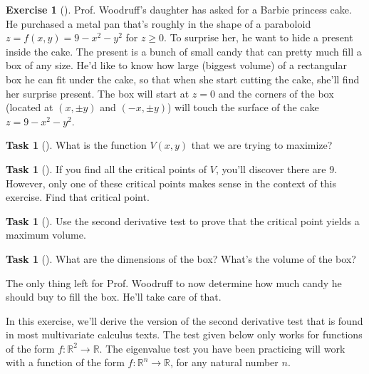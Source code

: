 \documentclass[10pt,]{book}
\theoremstyle{plain}
\theoremstyle{definition}
\theoremstyle{definition}
\theoremstyle{definition}
\theoremstyle{definition}
\newtheorem{exploration}[project]{Exercise}
\newtheorem{task}[project]{Task}
\theoremstyle{definition}
\numberwithin{equation}{section}
\begin{document}
\begin{exploration}[]\label{optimize_box_in_cake}
Prof. Woodruff's daughter has asked for a Barbie princess cake. He purchased a metal pan that's roughly in the shape of a paraboloid \(z=f(x,y)=9-x^2-y^2\) for \(z\geq 0\). To surprise her, he want to hide a present inside the cake. The present is a bunch of small candy that can pretty much fill a box of any size. He'd like to know how large (biggest volume) of a rectangular box he can fit under the cake, so that when she start cutting the cake, she'll find her surprise present. The box will start at \(z=0\) and the corners of the box (located at \((x,\pm y)\) and \((-x,\pm y)\)) will touch the surface of the cake \(z=9-x^2-y^2\).%
\begin{task}[]\label{task-639}
What is the function \(V(x,y)\) that we are trying to maximize?%
\end{task}
\begin{task}[]\label{task-640}
If you find all the critical points of \(V\), you'll discover there are 9.  However, only one of these critical points makes sense in the context of this exercise. Find that critical point.%
\end{task}
\begin{task}[]\label{task-641}
Use the second derivative test to prove that the critical point yields a maximum volume.%
\end{task}
\begin{task}[]\label{task-642}
What are the dimensions of the box? What's the volume of the box?%
\end{task}
The only thing left for Prof. Woodruff to now determine how much candy he should buy to fill the box. He'll take care of that.%
\end{exploration}
In this exercise, we'll derive the version of the second derivative test that is found in most multivariate calculus texts. The test given below only works for functions of the form \(f:\mathbb{R}^2\to\mathbb{R}\). The eigenvalue test you have been practicing will work with a function of the form \(f:\mathbb{R}^n\to\mathbb{R}\), for any natural number \(n\).%
\end{document}
